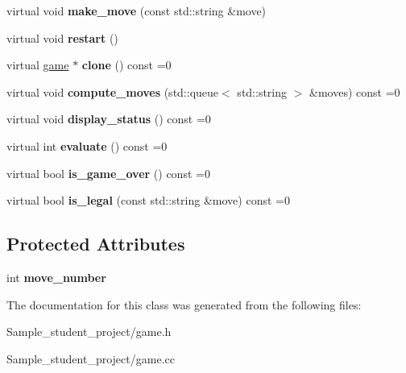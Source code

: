 \begin{DoxyCompactItemize}
\item 
\mbox{\label{classmain__savitch__14_1_1game_a20597d0caa907aea47b27fed8be3759b}} 
virtual void {\bfseries make\+\_\+move} (const std\+::string \&move)
\item 
\mbox{\label{classmain__savitch__14_1_1game_ad521a7d78e7c163a0bc28b709f0d45fd}} 
virtual void {\bfseries restart} ()
\item 
\mbox{\label{classmain__savitch__14_1_1game_a7b663057f59210dd52738facfc40d959}} 
virtual \mbox{\hyperlink{classmain__savitch__14_1_1game}{game}} $\ast$ {\bfseries clone} () const =0
\item 
\mbox{\label{classmain__savitch__14_1_1game_a2c0c049f5861026d0f639b5837889b7a}} 
virtual void {\bfseries compute\+\_\+moves} (std\+::queue$<$ std\+::string $>$ \&moves) const =0
\item 
\mbox{\label{classmain__savitch__14_1_1game_ac8205178922c49bab2865187e834b726}} 
virtual void {\bfseries display\+\_\+status} () const =0
\item 
\mbox{\label{classmain__savitch__14_1_1game_a9b9c8c5e9aa57c9a430f20b87cb047aa}} 
virtual int {\bfseries evaluate} () const =0
\item 
\mbox{\label{classmain__savitch__14_1_1game_a49eed20648918b03fd3e2cf78987b3d1}} 
virtual bool {\bfseries is\+\_\+game\+\_\+over} () const =0
\item 
\mbox{\label{classmain__savitch__14_1_1game_ad38351422ca1ee3ae58440c1c6b36b30}} 
virtual bool {\bfseries is\+\_\+legal} (const std\+::string \&move) const =0
\end{DoxyCompactItemize}
\subsection*{Protected Attributes}
\begin{DoxyCompactItemize}
\item 
\mbox{\label{classmain__savitch__14_1_1game_ac4c296f4370d8e5bb5ea74b638fb827d}} 
int {\bfseries move\+\_\+number}
\end{DoxyCompactItemize}


The documentation for this class was generated from the following files\+:\begin{DoxyCompactItemize}
\item 
Sample\+\_\+student\+\_\+project/game.\+h\item 
Sample\+\_\+student\+\_\+project/game.\+cc\end{DoxyCompactItemize}
